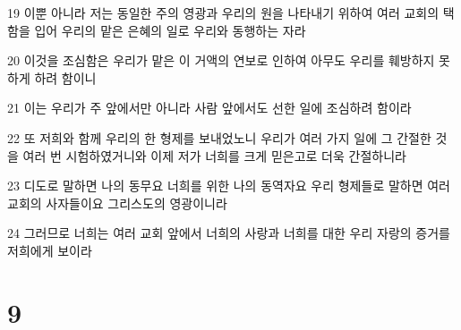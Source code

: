 \par 19 이뿐 아니라 저는 동일한 주의 영광과 우리의 원을 나타내기 위하여 여러 교회의 택함을 입어 우리의 맡은 은혜의 일로 우리와 동행하는 자라
\par 20 이것을 조심함은 우리가 맡은 이 거액의 연보로 인하여 아무도 우리를 훼방하지 못하게 하려 함이니
\par 21 이는 우리가 주 앞에서만 아니라 사람 앞에서도 선한 일에 조심하려 함이라
\par 22 또 저희와 함께 우리의 한 형제를 보내었노니 우리가 여러 가지 일에 그 간절한 것을 여러 번 시험하였거니와 이제 저가 너희를 크게 믿은고로 더욱 간절하니라
\par 23 디도로 말하면 나의 동무요 너희를 위한 나의 동역자요 우리 형제들로 말하면 여러 교회의 사자들이요 그리스도의 영광이니라
\par 24 그러므로 너희는 여러 교회 앞에서 너희의 사랑과 너희를 대한 우리 자랑의 증거를 저희에게 보이라

\chapter{9}

